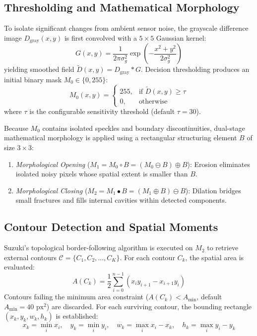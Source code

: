 \documentclass[conference]{IEEEtran}
\begin{document}
\subsection{Thresholding and Mathematical Morphology}
To isolate significant changes from ambient sensor noise, the grayscale difference image $D_{\text{gray}}(x, y)$ is first convolved with a $5 \times 5$ Gaussian kernel:
\begin{equation}
G(x, y) = \frac{1}{2\pi\sigma_g^2} \exp\left(-\frac{x^2+y^2}{2\sigma_g^2}\right)
\end{equation}
yielding smoothed field $\widetilde{D}(x, y) = D_{\text{gray}} * G$. Decision thresholding produces an initial binary mask $M_0 \in \{0, 255\}$:
\begin{equation}
M_0(x, y) = \begin{cases} 255, & \text{if } \widetilde{D}(x, y) \ge \tau \\ 0, & \text{otherwise} \end{cases}
\end{equation}
where $\tau$ is the configurable sensitivity threshold (default $\tau = 30$).

Because $M_0$ contains isolated speckles and boundary discontinuities, dual-stage mathematical morphology is applied using a rectangular structuring element $B$ of size $3 \times 3$:
\begin{enumerate}
    \item \textit{Morphological Opening} ($M_1 = M_0 \circ B = (M_0 \ominus B) \oplus B$): Erosion eliminates isolated noisy pixels whose spatial extent is smaller than $B$.
    \item \textit{Morphological Closing} ($M_2 = M_1 \bullet B = (M_1 \oplus B) \ominus B$): Dilation bridges small fractures and fills internal cavities within detected components.
\end{enumerate}

\subsection{Contour Detection and Spatial Moments}
Suzuki's topological border-following algorithm is executed on $M_2$ to retrieve external contours $\mathcal{C} = \{C_1, C_2, \dots, C_K\}$. For each contour $C_k$, the spatial area is evaluated:
\begin{equation}
A(C_k) = \frac{1}{2}\sum_{i=0}^{n-1} (x_i y_{i+1} - x_{i+1} y_i)
\end{equation}
Contours failing the minimum area constraint ($A(C_k) < A_{\min}$, default $A_{\min} = 40 \text{ px}^2$) are discarded. For each surviving contour, the bounding rectangle $(x_k, y_k, w_k, h_k)$ is established:
\begin{equation}
x_k = \min_{i} x_i, \quad y_k = \min_{i} y_i, \quad w_k = \max_{i} x_i - x_k, \quad h_k = \max_{i} y_i - y_k
\end{equation}
\end{document}
